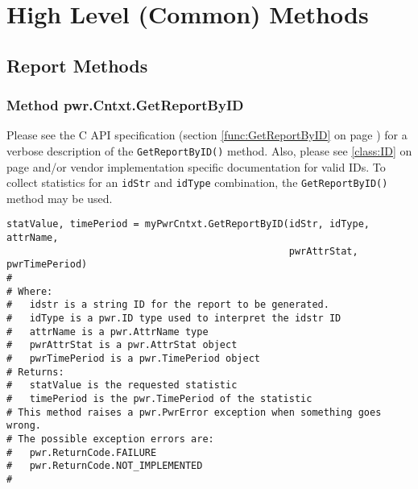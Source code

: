 \section{High Level (Common) Methods}\label{sec:PythonHighLevelCommonMethods}
\subsection{Report Methods}\label{sec:PythonReportMethods}

\subsubsection{Method pwr.Cntxt.GetReportByID} \label{meth:GetReportByID}

Please see the C API specification (section \ref{func:GetReportByID} on page
\pageref{func:GetReportByID}) for a verbose description of the \texttt{GetReportByID()} method. Also, please see
\ref{class:ID} on page \pageref{class:ID} and/or vendor implementation specific
documentation for valid IDs. To collect statistics for an \texttt{idStr} and \texttt{idType} combination, the \texttt{GetReportByID()} method may be used. 

\begin{center}\begin{minipage}{.95\linewidth}\begin{lstlisting}
statValue, timePeriod = myPwrCntxt.GetReportByID(idStr, idType, attrName,
                                                 pwrAttrStat, pwrTimePeriod)
#
# Where:
#   idstr is a string ID for the report to be generated.
#   idType is a pwr.ID type used to interpret the idstr ID
#   attrName is a pwr.AttrName type
#   pwrAttrStat is a pwr.AttrStat object
#   pwrTimePeriod is a pwr.TimePeriod object
# Returns:
#   statValue is the requested statistic
#   timePeriod is the pwr.TimePeriod of the statistic
# This method raises a pwr.PwrError exception when something goes wrong.
# The possible exception errors are: 
#   pwr.ReturnCode.FAILURE
#   pwr.ReturnCode.NOT_IMPLEMENTED
#
\end{lstlisting}\end{minipage}\end{center}


